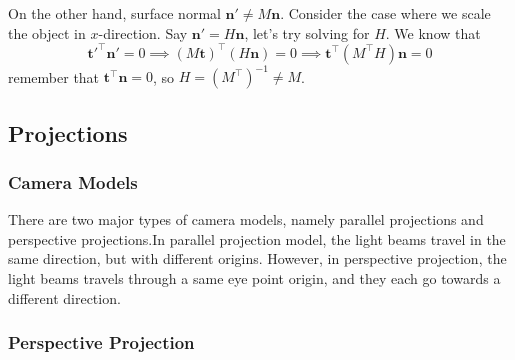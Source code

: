 \documentclass[11pt]{article}
\newcommand{\bn}{\mathbf{n}}
\newcommand{\bt}{\mathbf{t}}
\begin{document}
On the other hand, surface normal $\bn' \neq M\bn$. Consider the case where we scale the object in $x$-direction. Say $\bn' = H\bn$, let's try solving for $H$. We know that 
\begin{equation}
	\bt'^\top \bn' = 0 \implies (M\bt)^\top (H\bn) = 0 \implies \bt^\top (M^\top H) \bn = 0
\end{equation}
remember that $\bt^\top \bn = 0$, so $H = (M^\top) ^{-1} \neq M$. 

\subsection{Projections}
\subsubsection{Camera Models}
There are two major types of camera models, namely parallel projections and perspective projections.In parallel projection model, the light beams travel in the same direction, but with different origins. However, in perspective projection, the light beams travels through a same eye point origin, and they each go towards a different direction. 

\subsubsection{Perspective Projection}
\end{document}

